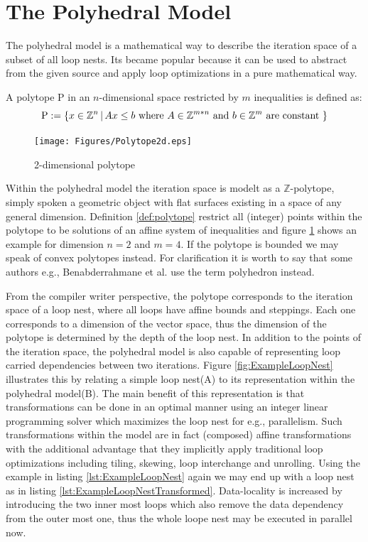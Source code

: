 \section{The Polyhedral Model}
The polyhedral model is a mathematical way to describe the iteration space of a
subset of all loop nests. Its became popular because it can be used to abstract
from the given source and apply loop optimizations in a pure mathematical way. 

\begin{definition}[Polytope]
  A polytope P in an $n$-dimensional space restricted by $m$ inequalities is defined as:
  \[ \text{P}:= \{ x \in \mathbb{Z}^n \, |\, Ax\leq b \text{ where $A\in\mathbb{Z}^{m*n} $ and $ b\in\mathbb{Z}^{m}$ are constant } \} \]
  \label{def:polytope}
\end{definition}


\begin{figure}
  \texttt{[image: Figures/Polytope2d.eps]}
  \caption{2-dimensional polytope}
  \label{fig:Polytope2d}
\end{figure}
Within the polyhedral model the iteration space is modelt as a $\mathbb{Z}$-polytope,
simply spoken a geometric object with flat surfaces existing in a space of 
any general dimension.  
Definition \ref{def:polytope} restrict all (integer) points within the polytope
to be solutions of an affine system of inequalities and figure \ref{fig:Polytope2d} 
shows an example for dimension $n = 2$ and $m = 4$. If the polytope is bounded 
we may speak of convex polytopes instead. For clarification it is worth to say
that some authors e.g., Benabderrahmane et al. \cite{BPCB10} use the term 
polyhedron instead. 


From the compiler writer perspective, the polytope corresponds to the iteration
space of a loop nest, where all loops have affine bounds and steppings.
Each one corresponds to a dimension of the vector space, thus the 
dimension of the polytope is determined by the depth of the loop nest. 
In addition to the points of the iteration space, the polyhedral model is also
capable of representing loop carried dependencies between two iterations. 
Figure \ref{fig:ExampleLoopNest} illustrates this by relating a simple loop 
nest({\footnotesize A}) to its representation within the polyhedral 
model({\footnotesize B}). The main benefit of 
this representation is that transformations can be done in an optimal manner
using an integer linear programming solver which maximizes the loop nest for 
e.g., parallelism. Such transformations within the model are in fact (composed)
affine transformations with the additional advantage that they implicitly apply 
traditional loop optimizations including tiling, skewing, loop interchange and
unrolling. Using the example in listing \ref{lst:ExampleLoopNest} again we may
end up with a loop nest as in listing \ref{lst:ExampleLoopNestTransformed}. 
Data-locality is increased by introducing the two inner most loops which also 
remove the data dependency from the outer most one, thus the whole loope nest
may be executed in parallel now.

